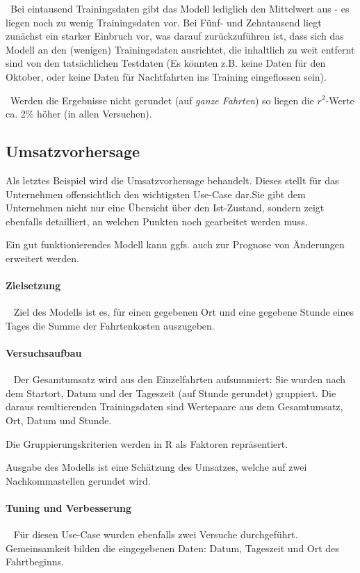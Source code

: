 ~\newline Bei eintausend Trainingsdaten gibt das Modell lediglich den Mittelwert aus - es liegen noch zu wenig Trainingsdaten vor. Bei Fünf- und Zehntausend liegt zunächst ein starker Einbruch vor, was darauf zurückzuführen ist, dass sich das Modell an den (wenigen) Trainingsdaten ausrichtet, die inhaltlich zu weit entfernt sind von den tatsächlichen Testdaten (Es könnten z.B. keine Daten für den Oktober, oder keine Daten für Nachtfahrten ins Training eingeflossen sein).

~\newline Werden die Ergebnisse nicht gerundet (auf \textit{ganze Fahrten}) so liegen die $r^2$-Werte ca. 2\% höher (in allen Versuchen).
\newpage
\subsection{Umsatzvorhersage}
\label{sec:RevPred}
Als letztes Beispiel wird die Umsatzvorhersage behandelt. Dieses stellt für das Unternehmen offensichtlich den wichtigsten Use-Case dar.Sie gibt dem Unternehmen nicht nur eine Übersicht über den Ist-Zustand, sondern zeigt ebenfalls detailliert, an welchen Punkten noch gearbeitet werden muss. 

Ein gut funktionierendes Modell kann ggfs. auch zur Prognose von Änderungen erweitert werden.
\paragraph{Zielsetzung} ~\newline
Ziel des Modells ist es, für einen gegebenen Ort und eine gegebene Stunde eines Tages die Summe der Fahrtenkosten auszugeben. 

\paragraph{Versuchsaufbau} ~\newline
Der Gesamtumsatz wird aus den Einzelfahrten aufsummiert: Sie wurden nach dem Startort, Datum und der Tageszeit (auf Stunde gerundet) gruppiert. Die daraus resultierenden Trainingsdaten sind Wertepaare aus dem Gesamtumsatz, Ort, Datum und Stunde. 

Die Gruppierungskriterien werden in R als Faktoren repräsentiert. 

Ausgabe des Modells ist eine Schätzung des Umsatzes, welche auf zwei Nachkommastellen gerundet wird. 

\paragraph{Tuning und Verbesserung} ~\newline
Für diesen Use-Case wurden ebenfalls zwei Versuche durchgeführt. Gemeinsamkeit bilden die eingegebenen Daten: Datum, Tageszeit und Ort des Fahrtbeginns. 

